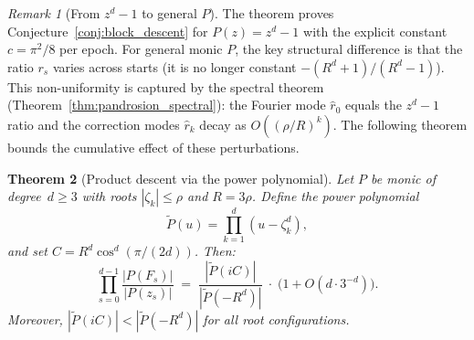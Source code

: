 \documentclass[10pt,a4paper,oneside]{book}
\newtheorem{theorem}{Theorem}[chapter]
\theoremstyle{definition}
\theoremstyle{remark}
\newtheorem{remark}[theorem]{Remark}
\begin{document}
\begin{remark}[From $z^d-1$ to general $P$]
\label{rem:general_descent}
The theorem proves Conjecture~\ref{conj:block_descent} for $P(z) = z^d - 1$ with the explicit constant $c = \pi^2/8$ per epoch.  For general monic $P$, the key structural difference is that the ratio $r_s$ varies across starts (it is no longer constant $-(R^d+1)/(R^d-1)$).  This non-uniformity is captured by the spectral theorem (Theorem~\ref{thm:pandrosion_spectral}): the Fourier mode $\hat{r}_0$ equals the $z^d-1$ ratio and the correction modes $\hat{r}_k$ decay as $O((\rho/R)^k)$.  The following theorem bounds the cumulative effect of these perturbations.
\end{remark}

\begin{theorem}[Product descent via the power polynomial]
\label{thm:power_polynomial}
Let $P$ be monic of degree~$d \geq 3$ with roots $|\zeta_k| \leq \rho$ and $R = 3\rho$.  Define the \emph{power polynomial}
\[
  \tilde{P}(u) = \prod_{k=1}^{d} (u - \zeta_k^d),
\]
and set $C = R^d \cos^d(\pi/(2d))$.  Then:
\begin{equation}
\label{eq:power_poly}
  \prod_{s=0}^{d-1}\frac{|P(F_s)|}{|P(z_s)|} \;=\;
  \frac{|\tilde{P}(iC)|}{|\tilde{P}(-R^d)|}\;\cdot\;
  \bigl(1 + O(d\cdot 3^{-d})\bigr).
\end{equation}
Moreover, $|\tilde{P}(iC)| < |\tilde{P}(-R^d)|$ for all root configurations.
\end{theorem}
\end{document}
